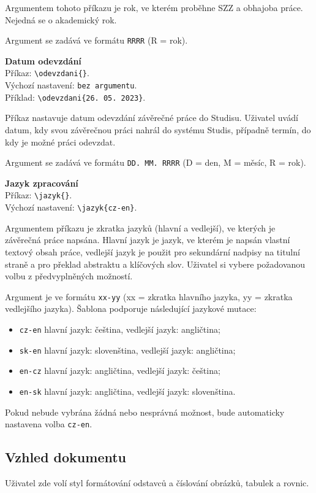 Argumentem tohoto příkazu je rok, ve kterém proběhne SZZ a obhajoba práce. Nejedná se o akademický rok.

Argument se zadává ve formátu \verb|RRRR| (R = rok).

\vspace{8pt}
\textbf{Datum odevzdání}\\
Příkaz: \verb|\odevzdani{}|.\\
Výchozí nastavení: \verb|bez argumentu|.\\
Příklad: \verb|\odevzdani{26. 05. 2023}|.

Příkaz nastavuje datum odevzdání závěrečné práce do Studisu. Uživatel uvádí datum, kdy svou závěrečnou práci nahrál do systému Studis, případně termín, do kdy je možné práci odevzdat.

Argument se zadává ve formátu \verb|DD. MM. RRRR| (D = den, M = měsíc, R = rok).

\vspace{8pt}
\textbf{Jazyk zpracování}\\
Příkaz: \verb|\jazyk{}|.\\
Výchozí nastavení: \verb|\jazyk{cz-en}|.

Argumentem příkazu je zkratka jazyků (hlavní a vedlejší), ve kterých je závěrečná práce napsána. Hlavní jazyk je jazyk, ve kterém je napsán vlastní textový obsah práce, vedlejší jazyk je použit pro sekundární nadpisy na titulní straně a pro překlad abstraktu a klíčových slov. Uživatel si vybere požadovanou volbu z předvyplněných možností.

Argument je ve formátu \verb|xx-yy| (xx = zkratka hlavního jazyka, yy = zkratka vedlejšího jazyka). Šablona podporuje následující jazykové mutace:

\begin{itemize}[label={-}]
	\item \verb|cz-en| hlavní jazyk: čeština, vedlejší jazyk: angličtina;
	\item \verb|sk-en| hlavní jazyk: slovenština, vedlejší jazyk: angličtina;
	\item \verb|en-cz| hlavní jazyk: angličtina, vedlejší jazyk: čeština;
	\item \verb|en-sk| hlavní jazyk: angličtina, vedlejší jazyk: slovenština.
\end{itemize}

Pokud nebude vybrána žádná nebo nesprávná možnost, bude automaticky nastavena volba \verb|cz-en|.



\subsection{Vzhled dokumentu}
Uživatel zde volí styl formátování odstavců a číslování obrázků, tabulek a rovnic.

